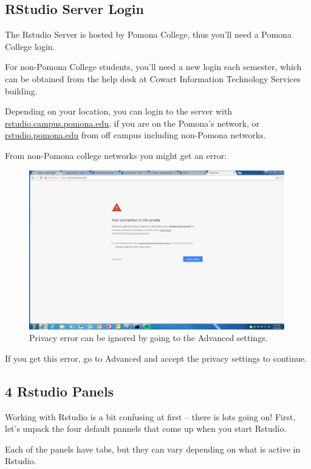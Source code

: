 \documentclass[12pt]{../SOP4_alpha}\usepackage[]{graphicx}\usepackage[]{color}
\begin{document}
\subsection{RStudio Server Login}

\NP The Rstudio Server is hosted by Pomona College, thus you'll need a Pomona College login. 

\NP For non-Pomona College students, you'll need a new login each semester, which can be obtained from the help desk at Cowart Information Technology Services building.

\NP Depending on your location, you can login to the server with \url{rstudio.campus.pomona.edu}, if you are on the Pomona's network, or \url{rstudio.pomona.edu} from off campus including non-Pomona networks.

\NP From non-Pomona college networks you might get an error:

\begin{figure}[t]
\centering
\includegraphics[width=0.99\textwidth]{graphics/Connect_Web_Privacy.JPG}
\caption{Privacy error can be ignored by going to the Advanced settings.}
\end{figure}

If you get this error, go to Advanced and accept the privacy settings to continue.

\subsection{4 Rstudio Panels}

Working with Rstudio is a bit confusing at first -- there is lots going on! First, let's unpack the four default pannels that come up when you start Rstudio. 

\NP Each of the panels have tabs, but they can vary depending on what is active in Rstudio. 
\end{document}
